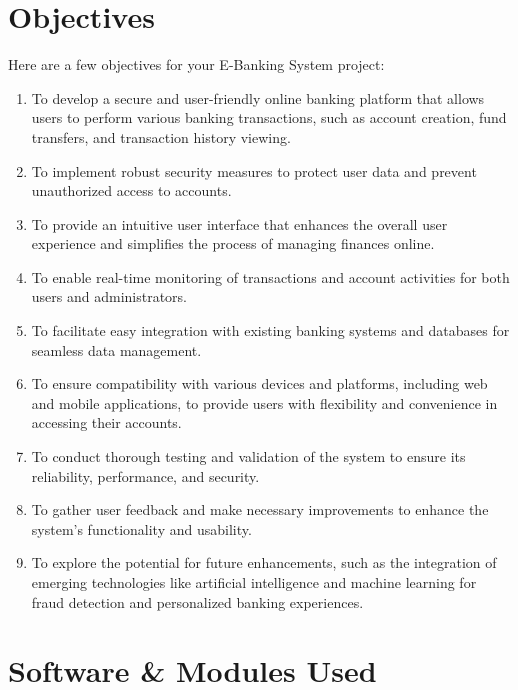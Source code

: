 \chapter{Objectives}

Here are a few objectives for your E-Banking System project:
\begin{enumerate}
  \item To develop a secure and user-friendly online banking platform
    that allows users to
    perform various banking transactions, such as account creation,
    fund transfers, and
    transaction history viewing.
  \item To implement robust security measures to protect user data
    and prevent unauthorized
    access to accounts.
  \item To provide an intuitive user interface that enhances the
    overall user experience and
    simplifies the process of managing finances online.
  \item To enable real-time monitoring of transactions and account
    activities for both users
    and administrators.
  \item To facilitate easy integration with existing banking systems
    and databases for
    seamless data management.
  \item To ensure compatibility with various devices and platforms,
    including web and
    mobile applications, to provide users with flexibility and
    convenience in accessing their
    accounts.
  \item To conduct thorough testing and validation of the system to
    ensure its reliability,
    performance, and security.
  \item To gather user feedback and make necessary improvements to
    enhance the system's
    functionality and usability.
  \item To explore the potential for future enhancements, such as the
    integration of
    emerging technologies like artificial intelligence and machine
    learning for fraud detection
    and personalized banking experiences.
\end{enumerate}

\chapter{Software \& Modules Used}

